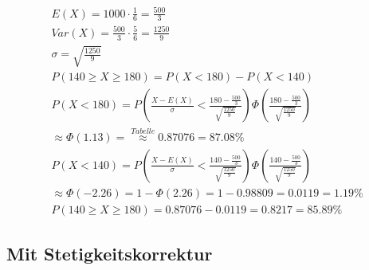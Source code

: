 \begin{align*}
    E(X) = 1000 \cdot \frac{1}{6} = \frac{500}{3} \\
    Var(X) = \frac{500}{3} \cdot \frac{5}{6} = \frac{1250}{9} \\
    \sigma = \sqrt{\frac{1250}{9}} \\
    P(140 \geq X \geq 180) = P(X < 180) - P(X < 140) \\
    P(X < 180) = P\left(\frac{X - E(X)}{\sigma} < \frac{180 - \frac{500}{3}}{\sqrt{\frac{1250}{9}}}\right)
    \Phi\left(\frac{180 - \frac{500}{3}}{\sqrt{\frac{1250}{9}}}\right) \\
    \approx \Phi(1.13) = \overset{Tabelle}{\approx} 0.87076 = 87.08\%\\
    P(X < 140) = P\left(\frac{X - E(X)}{\sigma} < \frac{140 - \frac{500}{3}}{\sqrt{\frac{1250}{9}}}\right)
    \Phi\left(\frac{140 - \frac{500}{3}}{\sqrt{\frac{1250}{9}}}\right) \\
    \approx \Phi(-2.26) = 1 - \Phi(2.26) = 1 - 0.98809 = 0.0119 = 1.19\% \\
    P(140 \geq X \geq 180) = 0.87076 - 0.0119 = 0.8217 = 85.89\%
\end{align*}

\subsection{Mit Stetigkeitskorrektur}

